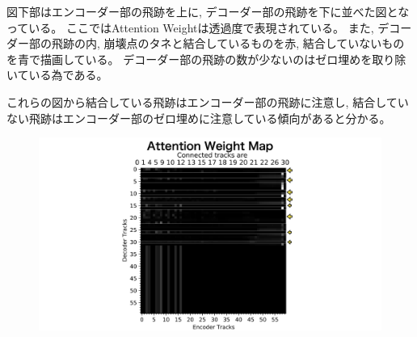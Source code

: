 図下部はエンコーダー部の飛跡を上に, デコーダー部の飛跡を下に並べた図となっている。
ここではAttention Weightは透過度で表現されている。
また, デコーダー部の飛跡の内, 崩壊点のタネと結合しているものを赤, 結合していないものを青で描画している。
デコーダー部の飛跡の数が少ないのはゼロ埋めを取り除いている為である。

これらの図から結合している飛跡はエンコーダー部の飛跡に注意し, 結合していない飛跡はエンコーダー部のゼロ埋めに注意している傾向があると分かる。

\begin{figure}[htbp]
 \centering
   \begin{minipage}{1.0\textwidth}
    \centering
    \includegraphics[trim = 200 0 200 0, width=1.0\textwidth, clip]{Figure/3Networks/3-4-3-3AttentionWeightMap.png}
   \end{minipage}
   

\end{figure}
